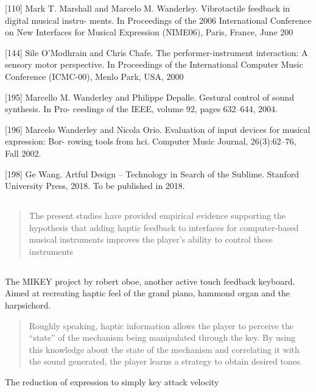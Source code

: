 [110] Mark T. Marshall and Marcelo M. Wanderley. Vibrotactile feedback in
digital musical instru- ments. In Proceedings of the 2006 International
Conference on New Interfaces for Musical Expression (NIME06), Paris, France,
June 200

[144] Sile O’Modhrain and Chris Chafe. The performer-instrument interaction: A
sensory motor perspective. In Proceedings of the International Computer Music
Conference (ICMC-00), Menlo Park, USA, 2000

[195] Marcello M. Wanderley and Philippe Depalle. Gestural control of sound
synthesis. In Pro- ceedings of the IEEE, volume 92, pages 632–644, 2004.

[196] Marcelo Wanderley and Nicola Orio. Evaluation of input devices for musical
expression: Bor- rowing tools from hci. Computer Music Journal, 26(3):62–76,
Fall 2002.

[198] Ge Wang. Artful Design – Technology in Search of the Sublime. Stanford
University Press, 2018. To be published in 2018.


\subsection{\cite{omodhrain_performer_2000}}

\begin{quotation}
    The present studies have provided empirical evidence supporting the
hypothesis that adding haptic feedback to interfaces for computer-based musical
instruments improves the player’s ability to control these instruments
\end{quotation}

\subsection{\cite{oboe_mikey_2006}}

The MIKEY project by robert oboe, another active touch feedback keyboard. Aimed at recreating haptic feel of the grand piano, hammond organ and the harpsichord.

\begin{quotation}
    Roughly speaking, haptic information allows the player to perceive the “state” of the mechanism being manipulated through the key. By using this knowledge about the state of the mechanism and correlating it with the sound generated, the player learns a strategy to obtain desired tones.
\end{quotation}


The reduction of expression to simply key attack velocity

